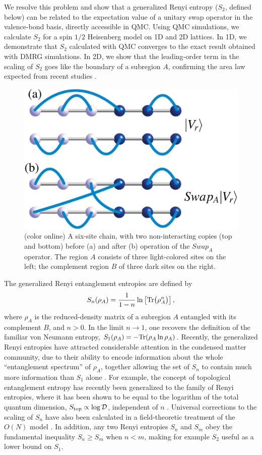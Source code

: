 \documentclass[prl,aps,twocolumn,floatfix,amsmath,amssymb,superscriptaddress,tightenlines]{revtex4}
\begin{document}
We resolve this problem and show that a generalized Renyi entropy ($S_2$, defined below) can be related to the expectation
value of a unitary swap operator in the valence-bond basis,
directly accessible in QMC.
Using QMC simulations, we calculate $S_2$ for a spin $1/2$ Heisenberg model
on 1D and 2D lattices.  In 1D, we demonstrate that $S_2$ calculated with QMC converges to the exact result obtained with DMRG simulations.  In 2D, we show that the leading-order term in the scaling of $S_2$ goes like the boundary of a subregion $A$, 
confirming the area law expected from recent studies \cite{Ann}.

\begin{figure} {
\includegraphics[width=2.4
in]{swap_2.eps} \caption{(color online) 
\label{swap_2}
A six-site chain, with two non-interacting copies (top and bottom) before (a) and after (b) operation of the $Swap_A$ operator.  
The region $A$ consists of three light-colored sites on the left; the complement region $B$ of three dark sites on the right.
}
} \end{figure}

The generalized Renyi entanglement entropies are defined by
\begin{equation}
S_{n} (\rho_A) = \frac{1}{1- n} \ln \left[{ {\rm Tr}\big( \rho_A^{n} \big) }\right],
\label{Sn}
\end{equation}
where $\rho_A$ is the reduced-density matrix of a subregion $A$ entangled with its complement $B$, and 
$n>0$.  In the limit $n \rightarrow 1$, one recovers the 
definition of the familiar von Neumann entropy, $S_1 (\rho_A) = - {\rm Tr}( \rho_A \ln \rho_A )$.  
Recently, the generalized Renyi entropies have attracted considerable attention in the condensed matter community, due to their ability to encode
information about the whole ``entanglement spectrum'' of $\rho_A$, together allowing the set of $S_{n}$ to contain 
much more information than $S_1$ alone \cite{Espec}.  For example, the concept of topological entanglement entropy has recently been
generalized to the family of Renyi entropies, where it has been shown to be equal to the logarithm of the total quantum 
dimension, $S_{\rm top} \propto \log {\mathcal D}$, independent of $n$ \cite{PI}.  Universal corrections to the scaling of $S_{n}$ 
have also been calculated in a field-theoretic treatment of the $O(N)$ model \cite{Max}.
In addition, any two Renyi entropies $S_{n}$ and $S_{m}$ obey the fundamental
inequality $S_{n} \geq S_{m}$ when $n < m$, making for example $S_2$ useful as a
lower bound on $S_1$.  
\end{document}
